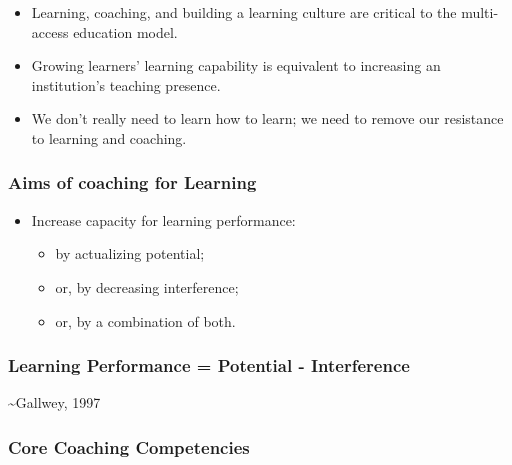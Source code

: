 \documentclass[
]{book}
\providecommand{\tightlist}{%
  \setlength{\itemsep}{0pt}\setlength{\parskip}{0pt}}
\begin{document}
\begin{itemize}
\tightlist
\item
  Learning, coaching, and building a learning culture are critical to the multi-access education model.
\item
  Growing learners' learning capability is equivalent to increasing an institution's teaching presence.
\item
  We don't really need to learn how to learn; we need to remove our resistance to learning and coaching.
\end{itemize}

\hypertarget{aims-of-coaching-for-learning}{%
\subsubsection*{Aims of coaching for Learning}\label{aims-of-coaching-for-learning}}

\begin{itemize}
\tightlist
\item
  Increase capacity for learning performance:

  \begin{itemize}
  \tightlist
  \item
    by actualizing potential;
  \item
    or, by decreasing interference;
  \item
    or, by a combination of both.
  \end{itemize}
\end{itemize}

\hypertarget{learning-performance-potential---interference}{%
\subsubsection*{Learning Performance = Potential - Interference}\label{learning-performance-potential---interference}}

\textasciitilde Gallwey, 1997

\hypertarget{core-coaching-competencies}{%
\subsubsection*{Core Coaching Competencies}\label{core-coaching-competencies}}
\end{document}
